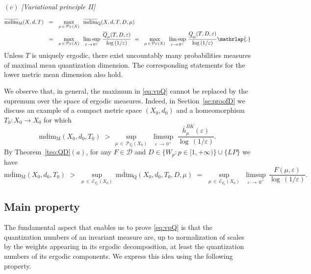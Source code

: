 \documentclass[11pt,a4paper,reqno]{amsart}
\theoremstyle{plain}
\theoremstyle{definition}
\newcommand{\ep} {\varepsilon}
\newcommand{\vep}{\varepsilon}
\newcommand{\cP}{{\mathcal P}}
\newcommand{\cD}{{\mathcal D}}
\newcommand{\cE}{{\mathcal E}}
\begin{document}
\noindent $(c)$ \emph{[Variational principle II]}

\begin{equation}\label{eq:vpQ}
\begin{alignedat}{3}
\mathrm{\overline{mdim}_M}(X,d,T)\,\,\,\, 
&=\,\,\,\, \max_{\mu\,\in\,\cP_T(X)}\,\, \,\mathrm{\overline{mdim}_Q}(X,d,T,D,\mu) \\
& =\,\,\,\, \max_{\mu\,\in\,\cP_T(X)}\, \,\,\limsup_{\ep\,\to\,0^+}\,\frac{\overline{Q}_\mu(T,D,\ep)}{\log\,(1/\ep)} 
& =\,\,\,\, \max_{\mu\,\in\,\cP_T(X)}\, \,\,\limsup_{\ep\,\to\,0^+}\,\frac{\underline{Q}_\mu(T,D,\ep)}{\log\,(1/\ep)} \mathrlap{.}
\end{alignedat}
\end{equation}
\smallskip Unless $T$ is uniquely ergodic, there exist uncountably many probabilities measures of maximal mean quantization dimension. The corresponding statements for the lower metric mean dimension also hold. 

\fi

\smallskip


We observe that, in general, the maximum in \eqref{eq:vpQ} cannot be replaced by the supremum over the space of ergodic measures. Indeed, in Section~\ref{se:proofD} we discuss an example of a compact metric space $(X_0,d_0)$ and a homeomorphism $T_0\colon X_0 \to X_0$ for which
$$\mathrm{\overline{mdim}_M}(X_0,d_0,T_0) \,\, >\, \sup_{\mu\,\in\,\cP_{T_0}(X_0)}\,\,  \limsup_{\vep \, \to \, 0^+} \, \,\frac{\overline{h}_\mu^{BK}(\ep)}{\log \,(1/\vep)}.$$
By Theorem~\ref{teo:QD}$(a)$, for any $F \in \cD$ and $D \in \{W_p\colon p \in [1,+\infty)\}\cup \{LP\}$ we have
$$\mathrm{\overline{mdim}_M}(X_0,d_0,T_0)\,\,>\,\, \sup_{\mu\,\in\,\cE_{T_0}(X_0)}\,\mathrm{\overline{mdim}_Q}(X_0,d_0,T_0,D,\mu)\,\,=\,\, \sup_{\mu\,\in\,\cE_{T_0}(X_0)}\,\,\limsup_{\ep\,\to\,0^+}\,\frac{F(\mu, \ep)}{\log\,(1/\ep)}.$$

\smallskip


\subsection{Main property}

The fundamental aspect that enables us to prove \eqref{eq:vpQ} is that the quantization numbers of an invariant measure are, up to normalization of scales by the weights appearing in its ergodic decomposition, at least the quantization numbers of its ergodic components. We express this idea using the following property.
\end{document}
